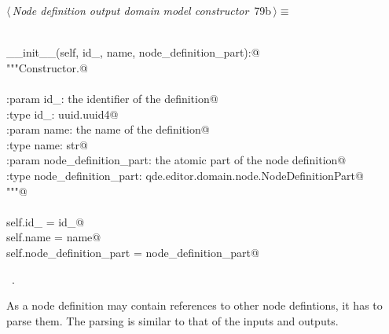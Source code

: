 \documentclass[
    a4paper,      %
    10pt,         %
    openright,    %
    notitlepage,  %
    parskip=half, %
]{scrreprt}       %
\theoremstyle{definition}                    %
\begin{document}
\begin{flushleft} \small
\begin{minipage}{\linewidth}\label{scrap129}\raggedright\small
{} $\langle\,${\itshape Node definition output domain model constructor}\nobreak\ {\footnotesize {79b}}$\,\rangle\equiv$
\vspace{-1exm}
\begin{list}{}{} \item
\mbox{}\lstinline@@\\
\mbox{}\lstinline@def __init__(self, id_, name, node_definition_part):@\\
\mbox{}\lstinline@    """Constructor.@\\
\mbox{}\lstinline@@\\
\mbox{}\lstinline@    :param id_: the identifier of the definition@\\
\mbox{}\lstinline@    :type  id_: uuid.uuid4@\\
\mbox{}\lstinline@    :param name: the name of the definition@\\
\mbox{}\lstinline@    :type  name: str@\\
\mbox{}\lstinline@    :param node_definition_part: the atomic part of the node definition@\\
\mbox{}\lstinline@    :type node_definition_part: qde.editor.domain.node.NodeDefinitionPart@\\
\mbox{}\lstinline@    """@\\
\mbox{}\lstinline@@\\
\mbox{}\lstinline@    self.id_                  = id_@\\
\mbox{}\lstinline@    self.name                 = name@\\
\mbox{}\lstinline@    self.node_definition_part = node_definition_part@{\NWsep}
\end{list}
\vspace{-1.5ex}
\footnotesize
\begin{list}{}{\setlength{\itemsep}{-\parsep}\setlength{\itemindent}{-\leftmargin}}
\item \NWtxtMacroRefIn\ .

\item{}
\end{list}
\end{minipage}\vspace{4ex}
\end{flushleft}
As a node definition may contain references to other node defintions, it has to
parse them. The parsing is similar to that of the inputs and outputs.
\end{document}
